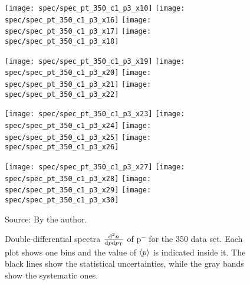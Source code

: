 \begin{figure}[!ht]
  \centering

  \texttt{[image: spec/spec\_pt\_350\_c1\_p3\_x10]}
  \texttt{[image: spec/spec\_pt\_350\_c1\_p3\_x16]}
  \texttt{[image: spec/spec\_pt\_350\_c1\_p3\_x17]}
  \texttt{[image: spec/spec\_pt\_350\_c1\_p3\_x18]}

  \texttt{[image: spec/spec\_pt\_350\_c1\_p3\_x19]}
  \texttt{[image: spec/spec\_pt\_350\_c1\_p3\_x20]}
  \texttt{[image: spec/spec\_pt\_350\_c1\_p3\_x21]}
  \texttt{[image: spec/spec\_pt\_350\_c1\_p3\_x22]}

  \texttt{[image: spec/spec\_pt\_350\_c1\_p3\_x23]}
  \texttt{[image: spec/spec\_pt\_350\_c1\_p3\_x24]}
  \texttt{[image: spec/spec\_pt\_350\_c1\_p3\_x25]}
  \texttt{[image: spec/spec\_pt\_350\_c1\_p3\_x26]}

  \texttt{[image: spec/spec\_pt\_350\_c1\_p3\_x27]}
  \texttt{[image: spec/spec\_pt\_350\_c1\_p3\_x28]}
  \texttt{[image: spec/spec\_pt\_350\_c1\_p3\_x29]}
  \texttt{[image: spec/spec\_pt\_350\_c1\_p3\_x30]}
 
  \caption{Double-differential spectra $\frac{\text{d}^2n}{\text{d}p\text{d}p_\text{T}}$
    of p$^-$ for the 350 \GeVc data set. Each plot shows one \pp bins and the value
    of $\langle p\rangle$ is indicated inside it. The black lines show the statistical
    uncertainties, while the gray bands show the systematic ones.}
  \label{fig:hadron:spec:dedx:all350:c1p3}
  \begin{center}
    \small Source: By the author. 
  \end{center}
\end{figure}

\clearpage

